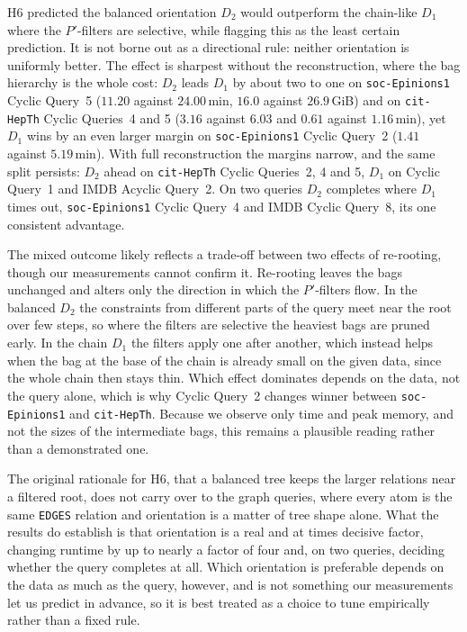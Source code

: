H6 predicted the balanced orientation $D_2$ would outperform the chain-like $D_1$ where the $P'$-filters are selective, while flagging this as the least certain prediction. It is not borne out as a directional rule: neither orientation is uniformly better. The effect is sharpest without the reconstruction, where the bag hierarchy is the whole cost: $D_2$ leads $D_1$ by about two to one on \texttt{soc-Epinions1} Cyclic Query~5 ($11.20$ against $24.00$\,min, $16.0$ against $26.9$\,GiB) and on \texttt{cit-HepTh} Cyclic Queries~4 and 5 ($3.16$ against $6.03$ and $0.61$ against $1.16$\,min), yet $D_1$ wins by an even larger margin on \texttt{soc-Epinions1} Cyclic Query~2 ($1.41$ against $5.19$\,min). With full reconstruction the margins narrow, and the same split persists: $D_2$ ahead on \texttt{cit-HepTh} Cyclic Queries~2, 4 and 5, $D_1$ on Cyclic Query~1 and IMDB Acyclic Query~2. On two queries $D_2$ completes where $D_1$ times out, \texttt{soc-Epinions1} Cyclic Query~4 and IMDB Cyclic Query~8, its one consistent advantage.

The mixed outcome likely reflects a trade-off between two effects of re-rooting, though our measurements cannot confirm it. Re-rooting leaves the bags unchanged and alters only the direction in which the $P'$-filters flow. In the balanced $D_2$ the constraints from different parts of the query meet near the root over few steps, so where the filters are selective the heaviest bags are pruned early. In the chain $D_1$ the filters apply one after another, which instead helps when the bag at the base of the chain is already small on the given data, since the whole chain then stays thin. Which effect dominates depends on the data, not the query alone, which is why Cyclic Query~2 changes winner between \texttt{soc-Epinions1} and \texttt{cit-HepTh}. Because we observe only time and peak memory, and not the sizes of the intermediate bags, this remains a plausible reading rather than a demonstrated one.

The original rationale for H6, that a balanced tree keeps the larger relations near a filtered root, does not carry over to the graph queries, where every atom is the same \texttt{EDGES} relation and orientation is a matter of tree shape alone. What the results do establish is that orientation is a real and at times decisive factor, changing runtime by up to nearly a factor of four and, on two queries, deciding whether the query completes at all. Which orientation is preferable depends on the data as much as the query, however, and is not something our measurements let us predict in advance, so it is best treated as a choice to tune empirically rather than a fixed rule.

